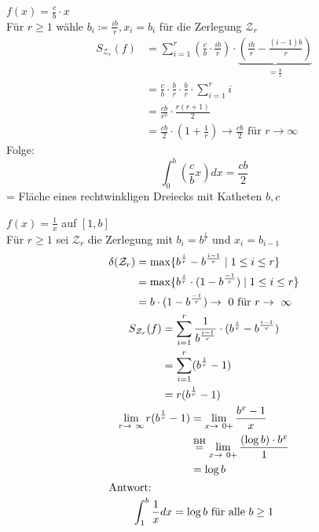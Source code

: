 \begin{bsp}
	$f(x) = \frac{c}{b} \cdot x$ \\
	Für $r \geq 1$ wähle $b_i \coloneqq \frac{ib}{r} , x_i = b_i$ für die Zerlegung $\mathcal{Z}_r$
	\[ \begin{split}
		S_{\mathcal{Z}_r}(f)	&= \sum_{i=1}^r \left( \frac{c}{b} \cdot \frac{ib}{r} \right) \cdot \underbrace{\left( \frac{ib}{r} - \frac{(i-1)b}{r} \right)}_{=\frac{b}{r}} \\
						&= \frac{c}{b} \cdot \frac{b}{r} \cdot \frac{b}{r} \cdot \sum_{i=1}^r i \\
						&= \frac{cb}{r^2} \cdot \frac{r(r+1)}{2} \\
						&= \frac{cb}{2} \cdot \left( 1 + \frac{1}{r} \right) \rightarrow \frac{cb}{2} \text{ für } r \rightarrow \infty
	\end{split} \]
	Folge:
	\[ \int_0^b \left( \frac{c}{b} x \right) dx = \frac{cb}{2} \]
	= Fläche eines rechtwinkligen Dreiecks mit Katheten $b,c$
\end{bsp}
\begin{bsp}
	$f(x) = \frac{1}{x}$ auf $[1,b]$ \\
	Für $r \geq 1$ sei $\mathcal{Z}_r$ die Zerlegung mit $b_i = b^{\frac{i}{r}}$ und $x_i = b_{i-1}$
	\begin{gather*}
		\begin{split}
			\delta(\mathcal{Z}_r)	&= \max\{ b^{\frac{i}{r}} - b^{\frac{i-1}{r}} \mid 1 \leq i \leq r \} \\
							&=  \max\{ b^{\frac{i}{r}} \cdot ( 1 - b^{\frac{-1}{r}} ) \mid 1 \leq i \leq r \} \\
							&= b \cdot ( 1 - b^{\frac{-1}{r}} ) \rightarrow 0 \text{ für } r \rightarrow \infty
		\end{split} \\
		\begin{split}
			S_{\mathcal{Z}_r}(f)	&= \sum_{i=1}^r \frac{1}{b^{\frac{i-1}{r}}} \cdot (  b^{\frac{i}{r}} - b^{\frac{i-1}{r}} ) \\
							&= \sum_{i=1}^r (b^{\frac{1}{r}} - 1) \\
							&= r ( b^{\frac{1}{r}} - 1 )
		\end{split} \\
		\begin{split}
			\lim_{r \rightarrow \infty} r ( b^{\frac{1}{r}} - 1)	&= \lim_{x \rightarrow 0+} \frac{b^x - 1}{x} \\
												&\overset{\text{BH}}{=} \lim_{x \rightarrow 0+} \frac{(\log b) \cdot b^x}{1} \\
												&=\log b
		\end{split}\\
		\intertext{Antwort:}
		\int_1^b \frac{1}{x} dx = \log b \text{ für alle } b \geq 1
	\end{gather*}
\end{bsp}
